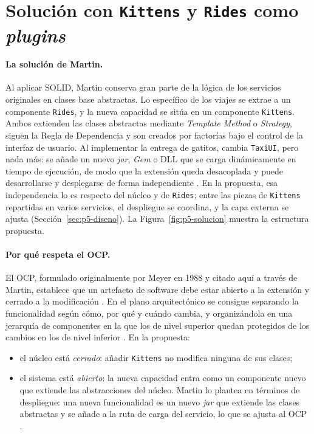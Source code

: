\section{Solución con \texttt{Kittens} y \texttt{Rides} como \emph{plugins}}
\label{sec:p5-plugins}

\paragraph{La solución de Martin.}
Al aplicar SOLID, Martin conserva gran parte de la lógica de los servicios originales en
clases base abstractas. Lo específico de los viajes se extrae a un componente
\texttt{Rides}, y la nueva capacidad se sitúa en un componente \texttt{Kittens}. Ambos
extienden las clases abstractas mediante \emph{Template Method} o \emph{Strategy},
siguen la Regla de Dependencia y son creados por factorías bajo el control de la interfaz
de usuario. Al implementar la entrega de gatitos, cambia \texttt{TaxiUI}, pero nada más:
se añade un nuevo \emph{jar}, \emph{Gem} o DLL que se carga dinámicamente en tiempo de
ejecución, de modo que la extensión queda desacoplada y puede desarrollarse y desplegarse
de forma independiente \parencite[244]{martin2017}. En la propuesta, esa independencia lo
es respecto del núcleo y de \texttt{Rides}; entre las piezas de \texttt{Kittens}
repartidas en varios servicios, el despliegue se coordina, y la capa externa se ajusta
(Sección~\ref{sec:p5-diseno}). La Figura~\ref{fig:p5-solucion}
muestra la estructura propuesta.

\paragraph{Por qué respeta el OCP.}
El OCP, formulado originalmente por Meyer en 1988 y citado aquí a través de Martin,
establece que un artefacto de software debe estar abierto a la extensión y cerrado a la
modificación . En el plano arquitectónico se consigue separando la funcionalidad según cómo,
por qué y cuándo cambia, y organizándola en una jerarquía de componentes en la que los de
nivel superior quedan protegidos de los cambios en los de nivel inferior
\parencite[74]{martin2017}. En la propuesta:
\begin{itemize}
  \item el núcleo está \emph{cerrado}: añadir \texttt{Kittens} no modifica ninguna de sus
        clases;
  \item el sistema está \emph{abierto}: la nueva capacidad entra como un componente nuevo
        que extiende las abstracciones del núcleo. Martin lo plantea en términos de
        despliegue: una nueva funcionalidad es un nuevo \emph{jar} que extiende las clases
        abstractas y se añade a la ruta de carga del servicio, lo que se ajusta al OCP
        \parencite[246]{martin2017}.
\end{itemize}

